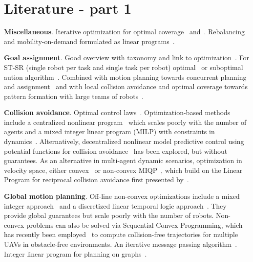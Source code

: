 
\section{Literature - part 1}\label{sec:3}

\textbf{Miscellaneous}. 
Iterative optimization for optimal coverage~\cite{cortes04} and~\cite{Schwager:2009fz}. Rebalancing and mobility-on-demand formulated as linear programs~\cite{Smith:2013fa}.

\textbf{Goal assignment}.
Good overview with taxonomy and link to optimization~\cite{Gerkey:2004il}. For ST-SR (single robot per task and single task per robot) optimal~\cite{kuhn55} or suboptimal aution algorithm~\cite{Bertsekas:1992wx}.
Combined with motion planning towards concurrent planning and assignment~\cite{Turpin:2014bu} and with local collision avoidance and optimal coverage towards pattern formation with large teams of robots~\cite{alonsomora12ijrr}.

\textbf{Collision avoidance}.
Optimal control laws~\cite{Hoffmann:2008vl}. Optimization-based methods include a centralized nonlinear program~\cite{Raghunathan:2004ga} which scales poorly with the number of agents and a mixed integer linear program (MILP) with constraints in dynamics~\cite{Kuwata:2007vq}.
 Alternatively, decentralized nonlinear model predictive control using potential functions for collision avoidance~\cite{Shim:2003ih} has been explored, but without guarantees.
As an alternative in multi-agent dynamic scenarios, optimization in velocity space, either convex~\cite{snape09, AlonsoMora:2014kb, alonsomora2015auro} or non-convex MIQP~\cite{alonsomora13icra}, which build on the Linear Program for reciprocal collision avoidance first presented by~\cite{vandenberg09}.

\textbf{Global motion planning}.
Off-line non-convex optimizations include a mixed integer approach~\cite{Mellinger:2012fi, Kushleyev:2012wy} and a discretized linear temporal logic approach~\cite{Saha:2014vi}. They provide global guarantees but scale poorly with the number of robots. 
Non-convex problems can also be solved via Sequential Convex Programming, which has recently been employed~\cite{augugliaro12} to compute collision-free trajectories for multiple UAVs in obstacle-free environments. An iterative message passing algorithm~\cite{Bento:2013td}. Integer linear program for planning on graphs~\cite{Yu:2013ij}.

